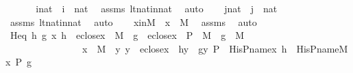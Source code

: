 \begin{isabellebody}
%
\isadelimproof
%
\endisadelimproof
%
\isatagproof
{}\isamarkupfalse%
\ {\isacharminus}{\kern0pt}\ \isanewline
\ \ \isamarkupfalse%
\ inat\ {\isacharcolon}{\kern0pt}\ {\isachardoublequoteopen}i\ {\isasymin}\ nat{\isachardoublequoteclose}\ \isamarkupfalse%
\ assms\ lt{\isacharunderscore}{\kern0pt}nat{\isacharunderscore}{\kern0pt}in{\isacharunderscore}{\kern0pt}nat\ \isamarkupfalse%
\ auto\isanewline
\ \ \isamarkupfalse%
\ jnat\ {\isacharcolon}{\kern0pt}\ {\isachardoublequoteopen}j\ {\isasymin}\ nat{\isachardoublequoteclose}\ \isamarkupfalse%
\ assms\ lt{\isacharunderscore}{\kern0pt}nat{\isacharunderscore}{\kern0pt}in{\isacharunderscore}{\kern0pt}nat\ \isamarkupfalse%
\ auto\isanewline
\ \ \isamarkupfalse%
\ xinM\ {\isacharcolon}{\kern0pt}\ {\isachardoublequoteopen}x\ {\isasymin}\ M{\isachardoublequoteclose}\ \isamarkupfalse%
\ assms\ \isamarkupfalse%
\ auto\isanewline
\isanewline
\ \ \isamarkupfalse%
\ Heq{\isacharcolon}{\kern0pt}\ {\isachardoublequoteopen}{\isasymAnd}h\ g\ x{\isachardot}{\kern0pt}\ h\ {\isasymin}\ eclose{\isacharparenleft}{\kern0pt}x{\isacharparenright}{\kern0pt}\ {\isasymrightarrow}\ M\ {\isasymLongrightarrow}\ g\ {\isasymin}\ eclose{\isacharparenleft}{\kern0pt}x{\isacharparenright}{\kern0pt}\ {\isasymtimes}\ {\isacharbraceleft}{\kern0pt}P{\isacharbraceright}{\kern0pt}\ {\isasymrightarrow}\ M\ {\isasymLongrightarrow}\ g\ {\isasymin}\ M\isanewline
\ \ \ \ \ \ \ \ \ \ \ \ \ \ \ {\isasymLongrightarrow}\ x\ {\isasymin}\ M\ {\isasymLongrightarrow}\ {\isacharparenleft}{\kern0pt}{\isasymAnd}y{\isachardot}{\kern0pt}\ y\ {\isasymin}\ eclose{\isacharparenleft}{\kern0pt}x{\isacharparenright}{\kern0pt}\ {\isasymLongrightarrow}\ h{\isacharbackquote}{\kern0pt}y\ {\isacharequal}{\kern0pt}\ g{\isacharbackquote}{\kern0pt}{\isacharless}{\kern0pt}y{\isacharcomma}{\kern0pt}\ P{\isachargreater}{\kern0pt}{\isacharparenright}{\kern0pt}\ {\isasymLongrightarrow}\ His{\isacharunderscore}{\kern0pt}P{\isacharunderscore}{\kern0pt}name{\isacharparenleft}{\kern0pt}x{\isacharcomma}{\kern0pt}\ h{\isacharparenright}{\kern0pt}\ {\isacharequal}{\kern0pt}\ His{\isacharunderscore}{\kern0pt}P{\isacharunderscore}{\kern0pt}name{\isacharunderscore}{\kern0pt}M{\isacharparenleft}{\kern0pt}{\isacharless}{\kern0pt}x{\isacharcomma}{\kern0pt}\ P{\isachargreater}{\kern0pt}{\isacharcomma}{\kern0pt}\ g{\isacharparenright}{\kern0pt}{\isachardoublequoteclose}\ \ \ \isanewline
\ \ \ \ \isamarkupfalse%

\end{isabellebody}
